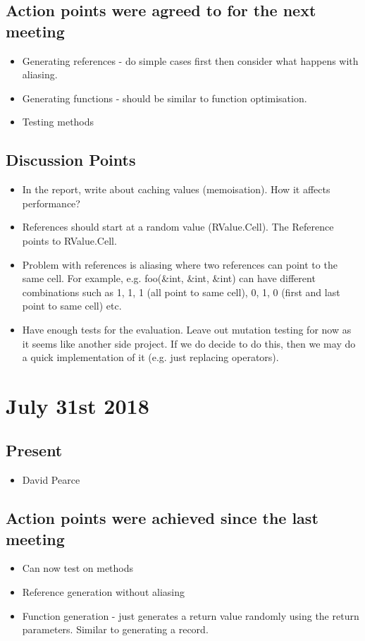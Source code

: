 \documentclass[]{article}
\begin{document}
\subsection{Action points were agreed to for the next meeting}
\begin{itemize}
	\item Generating references - do simple cases first then consider what happens with aliasing.
	\item Generating functions - should be similar to function optimisation.
	\item Testing methods
\end{itemize}

\subsection{Discussion Points}
\begin{itemize}
	\item In the report, write about caching values (memoisation). How it affects performance?
	\item References should start at a random value (RValue.Cell). The Reference points to RValue.Cell.
	\item Problem with references is aliasing where two references can point to the same cell.
	For example, e.g. foo(\&int, \&int, \&int) can have different combinations such as 1, 1, 1 (all point to same cell), 0, 1, 0 (first and last point to same cell) etc.
	\item Have enough tests for the evaluation. Leave out mutation testing for now as it seems like another side project. If we do decide to do this, then we may do a quick implementation of it (e.g. just replacing operators).
\end{itemize}

\section{July 31st 2018}
\subsection{Present}
\begin{itemize}
	\item David Pearce
\end{itemize}

\subsection{Action points were achieved since the last meeting}
\begin{itemize}
	\item Can now test on methods
	\item Reference generation without aliasing
	\item Function generation - just generates a return value randomly using the return parameters. Similar to generating a record.
\end{itemize}
\end{document}

